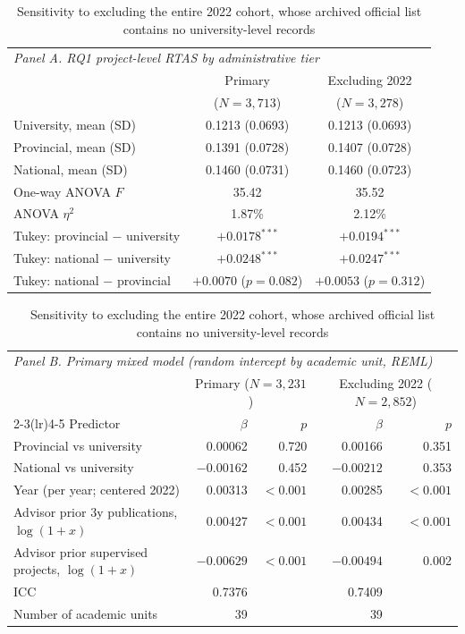 \documentclass[a4paper,11pt]{article}
\begin{document}
\begin{table}[htbp]
\centering
\caption{Sensitivity to excluding the entire 2022 cohort, whose archived official list contains no university-level records}
\label{tab:s2}
\footnotesize
\begin{tabular}{lcc}
\toprule
\multicolumn{3}{l}{\textit{Panel A. RQ1 project-level RTAS by administrative tier}}\\
& Primary & Excluding 2022\\
& ($N=3{,}713$) & ($N=3{,}278$)\\
\midrule
University, mean (SD) & 0.1213 (0.0693) & 0.1213 (0.0693)\\
Provincial, mean (SD) & 0.1391 (0.0728) & 0.1407 (0.0728)\\
National, mean (SD) & 0.1460 (0.0731) & 0.1460 (0.0723)\\
One-way ANOVA $F$ & 35.42 & 35.52\\
ANOVA $\eta^2$ & 1.87\% & 2.12\%\\
Tukey: provincial $-$ university & $+0.0178^{***}$ & $+0.0194^{***}$\\
Tukey: national $-$ university & $+0.0248^{***}$ & $+0.0247^{***}$\\
Tukey: national $-$ provincial & $+0.0070$ ($p=0.082$) & $+0.0053$ ($p=0.312$)\\
\bottomrule
\end{tabular}

\vspace{1.5em}

\begin{tabular}{lrrrr}
\toprule
\multicolumn{5}{l}{\textit{Panel B. Primary mixed model (random intercept by academic unit, REML)}}\\
& \multicolumn{2}{c}{Primary ($N=3{,}231$)} & \multicolumn{2}{c}{Excluding 2022 ($N=2{,}852$)}\\
\cmidrule(lr){2-3}\cmidrule(lr){4-5}
Predictor & $\beta$ & $p$ & $\beta$ & $p$\\
\midrule
Provincial vs university & 0.00062 & 0.720 & 0.00166 & 0.351\\
National vs university & $-0.00162$ & 0.452 & $-0.00212$ & 0.353\\
Year (per year; centered 2022) & 0.00313 & $<0.001$ & 0.00285 & $<0.001$\\
Advisor prior 3y publications, $\log(1+x)$ & 0.00427 & $<0.001$ & 0.00434 & $<0.001$\\
Advisor prior supervised projects, $\log(1+x)$ & $-0.00629$ & $<0.001$ & $-0.00494$ & 0.002\\
\midrule
ICC & 0.7376 & & 0.7409 & \\
Number of academic units & 39 & & 39 & \\
\bottomrule
\end{tabular}


\end{table}
\end{document}
